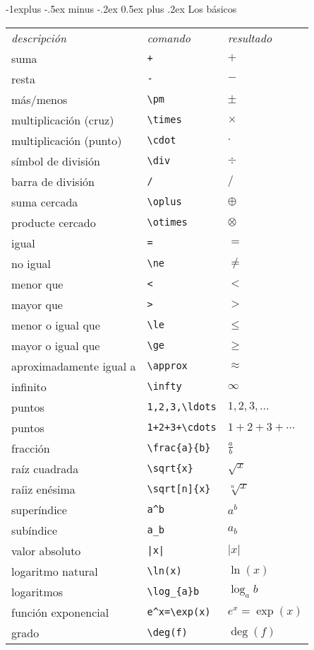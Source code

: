 \documentclass[10pt,landscape]{article}
\makeatletter
\renewcommand{\subsection}{\@startsection{subsection}{2}{0mm}%
                                {-1explus -.5ex minus -.2ex}%
                                {0.5ex plus .2ex}%
                                {\normalfont\normalsize\bfseries}}
\makeatother
\begin{document}
\begin{multicols}{3}
\subsection{Los básicos}
\begin{tabular}{lll}
\emph{descripción} & \emph{comando} & \emph{resultado}\\
suma & \verb!+! & $+$\\
resta & \verb!-! & $-$\\
más/menos & \verb!\pm! & $\pm$\\
multiplicación (cruz) & \verb!\times! & $\times$\\
multiplicación (punto) & \verb!\cdot! & $\cdot$\\
símbol de división& \verb!\div! & $\div$\\
barra de división & \verb!/! & $/$\\
suma cercada & \verb!\oplus! & $\oplus$\\
producte cercado & \verb!\otimes! & $\otimes$\\
igual & \verb!=! & $=$\\
no igual & \verb!\ne! & $\ne$\\
menor que & \verb!<! & $<$\\
mayor que & \verb!>! & $>$\\
menor o igual que & \verb!\le! & $\le$\\
mayor o igual que & \verb!\ge! & $\ge$\\
aproximadamente igual a  & \verb!\approx! & $\approx$\\
infinito & \verb!\infty! & $\infty$\\
puntos & \verb!1,2,3,\ldots! & $1,2,3,\ldots$\\
puntos & \verb!1+2+3+\cdots! & $1+2+3+\cdots$\\
fracción & \verb!\frac{a}{b}! & $\frac{a}{b}$\\
raíz cuadrada & \verb!\sqrt{x}! & $\sqrt{x}$\\
raíiz enésima & \verb!\sqrt[n]{x}! & $\sqrt[n]{x}$\\
superíndice & \verb!a^b! & $a^{b}$\\
subíndice & \verb!a_b! & $a_{b}$\\
valor absoluto & \verb!|x|! & $|x|$\\
logaritmo natural  & \verb!\ln(x)! & $\ln(x)$\\
logaritmos & \verb!\log_{a}b! & $\log_{a}b$\\
función exponencial & \verb!e^x=\exp(x)! & $e^{x}=\exp(x)$\\
grado & \verb!\deg(f)! & $\deg(f)$\\
\end{tabular}
\newpage



\end{multicols}
\end{document}
